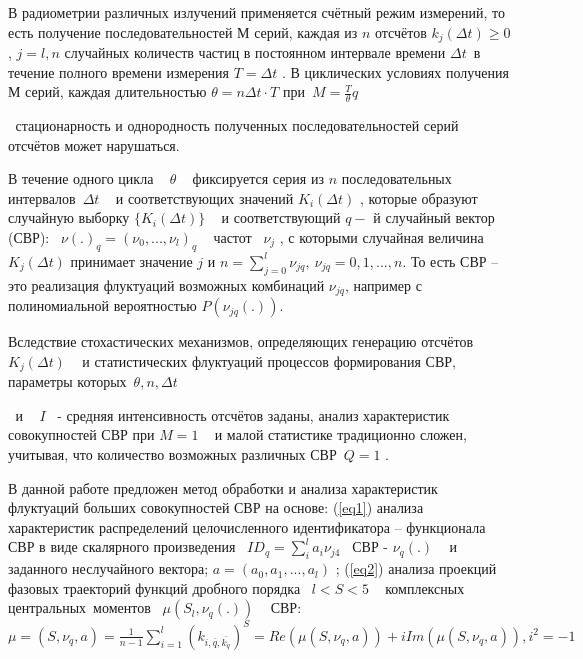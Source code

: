 
\vzmscaption
{ В радиометрии различных излучений применяется счётный режим
измерений, то есть получение последовательностей М серий, каждая из
$ n $    отсчётов  $k_{j} (\Delta t)\geqslant 0$
, $j=l,n$
  случайных количеств частиц в постоянном интервале времени }$\Delta t_{\,
}${   в течение полного времени измерения  }$T=\Delta t${ .   В
циклических условиях получения М серий, каждая длительностью  }$\theta
=n\Delta t\cdot T${    при~}$M=\frac{T}{\theta }q${ $_{~}${
стационарность и однородность полученных последовательностей серий отсчётов
может нарушаться.}

{ В течение одного
цикла ~ }${{\theta
}}${ ~ фиксируется серия из $n $ последовательных
интервалов~}$\Delta t${ ~ и соответствующих значений
}$K_{i}(\Delta t)${ , которые образуют случайную выборку $\{K_{i}(\Delta t)\}$
 ~ и соответствующий }{ $q-$}{ й случайный вектор
(СВР): ~}$\nu(.)_{q}=(\nu_{0},...,\nu_{l})_{q}${ ~ частот ~}$\nu_{j}${ , с
которыми случайная величина $K_{j}(\Delta t)$ принимает значение
 $j $ и }$n = \sum\limits_{j=0}^l \nu_{jq},~\nu_{jq}=0,1,...,n$.
То есть СВР -- это реализация флуктуаций возможных комбинаций $\nu_{jq}$, например с полиномиальной
вероятностью $P(\nu_{jq}(.))$.

{ Вследствие стохастических механизмов, определяющих генерацию
отсчётов ~}$K_{j}(\Delta t)${ ~ и статистических флуктуаций процессов
формирования СВР, параметры которых~}$\theta,n,\Delta t${
$_{~}${ и ~}{ $I$}{~ - средняя интенсивность отсчётов заданы,
анализ характеристик совокупностей СВР при }$M=1${ ~ и
малой статистике традиционно сложен, учитывая, что количество возможных
различных СВР~}$Q=1${ .}

{ В данной работе предложен метод обработки и анализа характеристик
флуктуаций больших совокупностей СВР на основе: (\ref{eq1}) анализа характеристик
распределений целочисленного идентификатора -- функционала СВР в виде
скалярного произведения ~}$ID_{q}=\sum\limits_{i}^l a_{i}\nu_{j4}${ ~СВР - }$\nu_{q}(.)${ ~ и заданного неслучайного вектора; }$a=(a_{0},a_{1},...,a_{l})${ ; (\ref{eq2}) анализа проекций фазовых траекторий функций дробного порядка ~}$l<S<5${ ~ комплексных
центральных~моментов ~}$\mu(S_{l},\nu_{q}(.))${ ~ СВР: \\
}$\mu=(S,\nu_{q},a)=\frac{1}{n-1} \sum\limits_{i=1}^l (k_{i,\bar{q},\bar{k_{q}}})^{S}=Re(\mu(S,\nu_{q},a))+iIm(\mu(S,\nu_{q},a)),i^{2}=-1${

}}}
